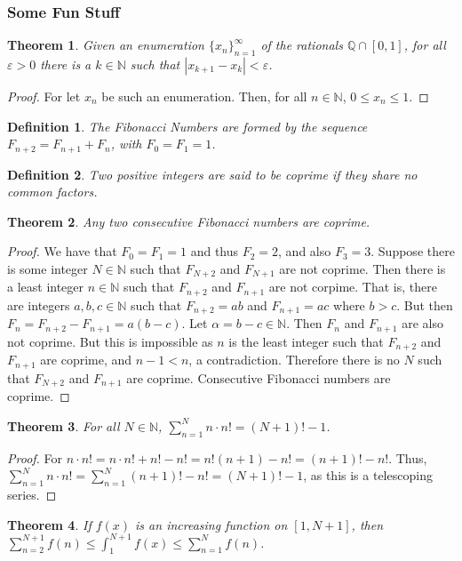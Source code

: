 \documentclass[crop=false,class=book]{standalone}
\theoremstyle{mystyle}
\newtheorem{theorem}{Theorem}[section]
\newtheorem{definition}{Definition}[section]
\begin{document}
\subsubsection{Some Fun Stuff}
\begin{theorem}
Given an enumeration $\{x_n\}_{n=1}^{\infty}$ of the rationals $\mathbb{Q}\cap [0,1]$, for all $\varepsilon>0$ there is a $k\in \mathbb{N}$ such that $|x_{k+1}-x_k|<\varepsilon$.
\end{theorem}
\begin{proof}
For let $x_n$ be such an enumeration. Then, for all $n\in \mathbb{N}$, $0 \leq x_n \leq 1$.
\end{proof}
\begin{definition}
The Fibonacci Numbers are formed by the sequence $F_{n+2}=F_{n+1}+F_{n}$, with $F_0=F_1 = 1$.
\end{definition}
\begin{definition}
Two positive integers are said to be coprime if they share no common factors.
\end{definition}
\begin{theorem}
Any two consecutive Fibonacci numbers are coprime.
\end{theorem}
\begin{proof}
We have that $F_0=F_1 = 1$ and thus $F_2 = 2$, and also $F_3 = 3$. Suppose there is some integer $N\in \mathbb{N}$ such that $F_{N+2}$ and $F_{N+1}$ are not coprime. Then there is a least integer $n\in \mathbb{N}$ such that $F_{n+2}$ and $F_{n+1}$ are not corpime. That is, there are integers $a,b,c\in \mathbb{N}$ such that $F_{n+2} = ab$ and $F_{n+1} = ac$ where $b>c$. But then $F_{n} = F_{n+2} - F_{n+1} = a(b-c)$. Let $\alpha = b-c \in \mathbb{N}$. Then $F_n$ and $F_{n+1}$ are also not coprime. But this is impossible as $n$ is the least integer such that $F_{n+2}$ and $F_{n+1}$ are coprime, and $n-1<n$, a contradiction. Therefore there is no $N$ such that $F_{N+2}$ and $F_{n+1}$ are coprime. Consecutive Fibonacci numbers are coprime. 
\end{proof}
\begin{theorem}
For all $N\in \mathbb{N}$, $\sum_{n=1}^{N} n\cdot n! = (N+1)!-1$.
\end{theorem}
\begin{proof}
For $n\cdot n! = n\cdot n! + n! - n! = n!(n+1) - n!=(n+1)!-n!$. Thus, $\sum_{n=1}^{N} n\cdot n! = \sum_{n=1}^{N} (n+1)! -n! = (N+1)!-1$, as this is a telescoping series.
\end{proof}
\begin{theorem}
If $f(x)$ is an increasing function on $[1,N+1]$, then $\sum_{n=2}^{N+1} f(n) \leq \int_{1}^{N+1} f(x) \leq \sum_{n=1}^{N} f(n)$.
\end{theorem}
\end{document}
